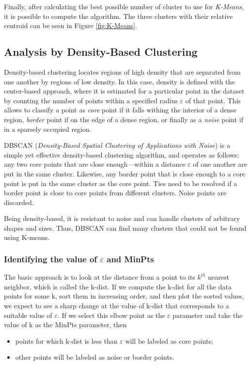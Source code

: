 \documentclass[a4paper,11pt,dvipsnames]{article}
\begin{document}
Finally, after calculating the best possible number of cluster to use for \textit{K-Means}, it is possible to compute the algorithm. The three clusters with their relative centroid can be seen in Figure \ref{fig:K-Means}.

\subsection{Analysis by Density-Based Clustering}
Density-based clustering locates regions of high density that are separated from one another by regions of low density. In this case, density is defined with the center-based approach, where it is estimated for a particular point in the dataset by counting the number of points within a specified radius $\varepsilon$ of that point. This allows to classify a point as \textit{core} point if it falls withing the interior of a dense region, \textit{border} point if on the edge of a dense region, or finally as a \textit{noise} point if in a sparsely occupied region.

DBSCAN (\textit{Density-Based Spatial Clustering of Applications with Noise}) is a simple yet effective density-based clustering algorithm, and operates as follows: any two core points that are close enough—within a distance $\varepsilon$ of one another are put in the same cluster. Likewise, any border point that is close enough to a core point is put in the same cluster as the core point. Ties need to be resolved if a border point is close to core points from different clusters. Noise points are discarded.

Being density-based, it is resistant to noise and can handle clusters of arbitrary shapes and sizes. Thus, DBSCAN can find many clusters that could not be found using K-means.

\subsubsection{Identifying the value of $\varepsilon$ and MinPts}
The basic approach is to look at the distance from a point to its $k^{th}$ nearest neighbor, which is called the k-dist. If we compute the k-dist for all the data points for some k, sort them in increasing order, and then plot the sorted values, we expect to see a sharp change at the value of k-dist that corresponds to a suitable value of $\varepsilon$.
If we select this elbow point as the $\varepsilon$ parameter and take the value of k as the MinPts parameter, then 
\begin{itemize}
    \item points for which k-dist is less than $\varepsilon$ will be labeled as core points;
    \item  other points will be labeled as noise or border points.
\end{itemize}
\end{document}
